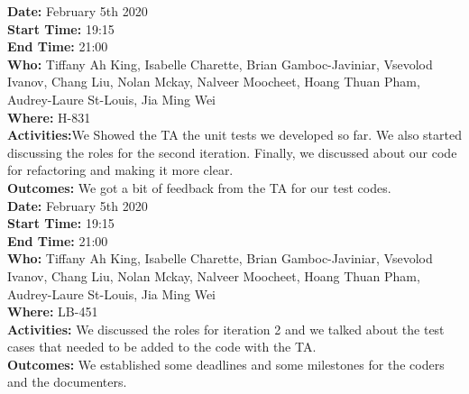 \documentclass[12pt]{article}
\begin{document}
{\bf Date:} February 5th 2020 \\
{\bf Start Time:} 19:15 \\
{\bf End Time:} 21:00 \\
{\bf Who:} Tiffany Ah King, Isabelle Charette, Brian Gamboc-Javiniar, Vsevolod Ivanov, Chang Liu, Nolan Mckay, Nalveer Moocheet, Hoang Thuan Pham, Audrey-Laure St-Louis, Jia Ming Wei \\
{\bf Where:} H-831 \\
{\bf Activities:}We Showed the TA the unit tests we developed so far. We also started discussing the roles for the second iteration. Finally, we discussed about our code for refactoring and making it more clear.\\
{\bf Outcomes:} We got a bit of feedback from the TA for our test codes.\\


{\bf Date:} February 5th 2020 \\
{\bf Start Time:} 19:15 \\
{\bf End Time:} 21:00 \\
{\bf Who:} Tiffany Ah King, Isabelle Charette, Brian Gamboc-Javiniar, Vsevolod Ivanov, Chang Liu, Nolan Mckay, Nalveer Moocheet, Hoang Thuan Pham, Audrey-Laure St-Louis, Jia Ming Wei \\
{\bf Where:} LB-451 \\
{\bf Activities:} We discussed the roles for iteration 2 and we talked about the test cases that needed to be added to the code with the TA. \\
{\bf Outcomes:} We established some deadlines and some milestones for the coders and the documenters. \\
\end{document}
